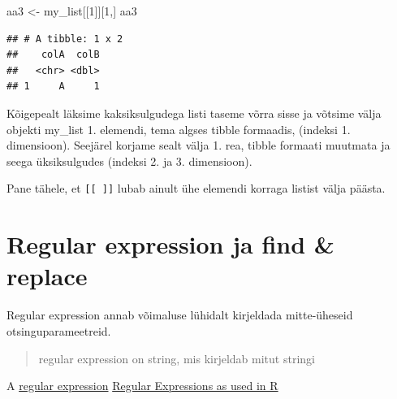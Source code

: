 \documentclass[]{book}
\newenvironment{Shaded}{\begin{snugshade}}{\end{snugshade}}
\newcommand{\DecValTok}[1]{\textcolor[rgb]{0.00,0.00,0.81}{#1}}
\newcommand{\StringTok}[1]{\textcolor[rgb]{0.31,0.60,0.02}{#1}}
\newcommand{\NormalTok}[1]{#1}
\begin{document}
\begin{Shaded}
\begin{Highlighting}[]
\NormalTok{aa3 <-}\StringTok{ }\NormalTok{my_list[[}\DecValTok{1}\NormalTok{]][}\DecValTok{1}\NormalTok{,]}
\NormalTok{aa3}
\end{Highlighting}
\end{Shaded}

\begin{verbatim}
## # A tibble: 1 x 2
##    colA  colB
##   <chr> <dbl>
## 1     A     1
\end{verbatim}

Kõigepealt läksime kaksiksulgudega listi taseme võrra sisse ja võtsime
välja objekti my\_list 1. elemendi, tema algses tibble formaadis,
(indeksi 1. dimensioon). Seejärel korjame sealt välja 1. rea, tibble
formaati muutmata ja seega üksiksulgudes (indeksi 2. ja 3. dimensioon).

Pane tähele, et \texttt{{[}{[}\ {]}{]}} lubab ainult ühe elemendi
korraga listist välja päästa.

\chapter{Regular expression ja find \& replace}\label{regex}

Regular expression annab võimaluse lühidalt kirjeldada mitte-üheseid
otsinguparameetreid.

\begin{quote}
regular expression on string, mis kirjeldab mitut stringi
\end{quote}

A
\href{https://stat.ethz.ch/R-manual/R-devel/library/base/html/regex.html}{regular
expression}
\href{https://stat.ethz.ch/R-manual/R-devel/library/base/html/regex.html}{Regular
Expressions as used in R}
\end{document}
